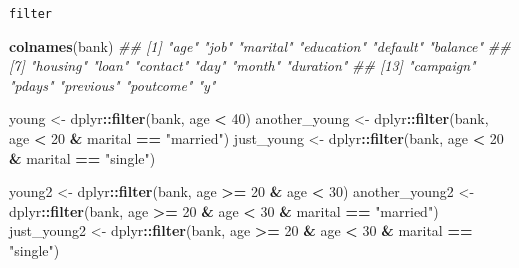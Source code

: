 \documentclass[
  10pt,
  ignorenonframetext,
  serif]{beamer}
\newenvironment{Shaded}{\begin{snugshade}}{\end{snugshade}}
\newcommand{\CommentTok}[1]{\textcolor[rgb]{0.56,0.35,0.01}{\textit{#1}}}
\newcommand{\DecValTok}[1]{\textcolor[rgb]{0.00,0.00,0.81}{#1}}
\newcommand{\KeywordTok}[1]{\textcolor[rgb]{0.13,0.29,0.53}{\textbf{#1}}}
\newcommand{\NormalTok}[1]{#1}
\newcommand{\OperatorTok}[1]{\textcolor[rgb]{0.81,0.36,0.00}{\textbf{#1}}}
\newcommand{\StringTok}[1]{\textcolor[rgb]{0.31,0.60,0.02}{#1}}
\begin{document}
\begin{frame}[fragile]{\texttt{filter}}
\protect\hypertarget{filter}{}
\begin{Shaded}
\begin{Highlighting}[]
\KeywordTok{colnames}\NormalTok{(bank)}
\CommentTok{\#\#  [1] "age"       "job"       "marital"   "education" "default"   "balance"  }
\CommentTok{\#\#  [7] "housing"   "loan"      "contact"   "day"       "month"     "duration" }
\CommentTok{\#\# [13] "campaign"  "pdays"     "previous"  "poutcome"  "y"}

\NormalTok{young \textless{}{-}}\StringTok{ }\NormalTok{dplyr}\OperatorTok{::}\KeywordTok{filter}\NormalTok{(bank, age }\OperatorTok{\textless{}}\StringTok{ }\DecValTok{40}\NormalTok{)}
\NormalTok{another\_young \textless{}{-}}\StringTok{ }\NormalTok{dplyr}\OperatorTok{::}\KeywordTok{filter}\NormalTok{(bank, age }\OperatorTok{\textless{}}\StringTok{ }\DecValTok{20} \OperatorTok{\&}\StringTok{ }\NormalTok{marital }\OperatorTok{==}\StringTok{ "married"}\NormalTok{)}
\NormalTok{just\_young \textless{}{-}}\StringTok{ }\NormalTok{dplyr}\OperatorTok{::}\KeywordTok{filter}\NormalTok{(bank, age }\OperatorTok{\textless{}}\StringTok{ }\DecValTok{20} \OperatorTok{\&}\StringTok{ }\NormalTok{marital }\OperatorTok{==}\StringTok{ "single"}\NormalTok{)}

\NormalTok{young2 \textless{}{-}}\StringTok{ }\NormalTok{dplyr}\OperatorTok{::}\KeywordTok{filter}\NormalTok{(bank, age }\OperatorTok{\textgreater{}=}\StringTok{ }\DecValTok{20} \OperatorTok{\&}\StringTok{ }\NormalTok{age }\OperatorTok{\textless{}}\StringTok{ }\DecValTok{30}\NormalTok{)}
\NormalTok{another\_young2 \textless{}{-}}\StringTok{ }\NormalTok{dplyr}\OperatorTok{::}\KeywordTok{filter}\NormalTok{(bank, age }\OperatorTok{\textgreater{}=}\StringTok{ }\DecValTok{20} \OperatorTok{\&}\StringTok{ }\NormalTok{age }\OperatorTok{\textless{}}\StringTok{ }\DecValTok{30} \OperatorTok{\&}\StringTok{ }\NormalTok{marital }\OperatorTok{==}\StringTok{ "married"}\NormalTok{)}
\NormalTok{just\_young2 \textless{}{-}}\StringTok{ }\NormalTok{dplyr}\OperatorTok{::}\KeywordTok{filter}\NormalTok{(bank, age }\OperatorTok{\textgreater{}=}\StringTok{ }\DecValTok{20} \OperatorTok{\&}\StringTok{ }\NormalTok{age }\OperatorTok{\textless{}}\StringTok{ }\DecValTok{30} \OperatorTok{\&}\StringTok{ }\NormalTok{marital }\OperatorTok{==}\StringTok{ "single"}\NormalTok{)}
\end{Highlighting}
\end{Shaded}
\end{frame}
\end{document}
